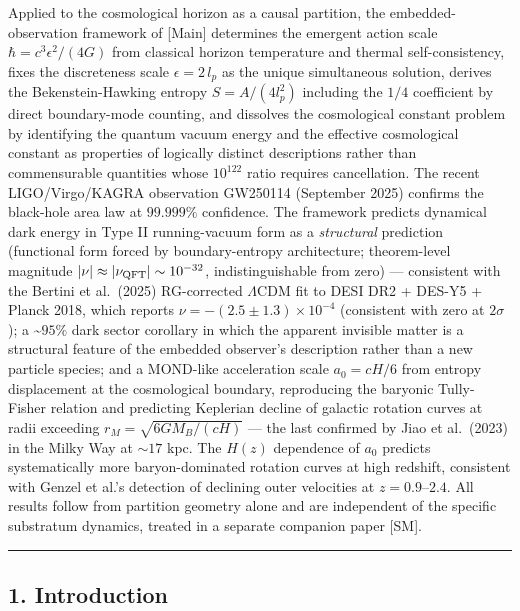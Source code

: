 \documentclass[
]{article}
\begin{document}
Applied to the cosmological horizon as a causal partition, the
embedded-observation framework of {[}Main{]} determines the emergent
action scale \(\hbar = c^3 \epsilon^2 / (4G)\) from classical horizon
temperature and thermal self-consistency, fixes the discreteness scale
\(\epsilon = 2\,l_p\) as the unique simultaneous solution, derives the
Bekenstein-Hawking entropy \(S = A/(4 l_p^2)\) including the \(1/4\)
coefficient by direct boundary-mode counting, and dissolves the
cosmological constant problem by identifying the quantum vacuum energy
and the effective cosmological constant as properties of logically
distinct descriptions rather than commensurable quantities whose
\(10^{122}\) ratio requires cancellation. The recent LIGO/Virgo/KAGRA
observation GW250114 (September 2025) confirms the black-hole area law
at \(99.999\%\) confidence. The framework predicts dynamical dark energy
in Type II running-vacuum form as a \emph{structural} prediction
(functional form forced by boundary-entropy architecture; theorem-level
magnitude \(|\nu| \approx |\nu_{\rm QFT}| \sim 10^{-32}\),
indistinguishable from zero) --- consistent with the Bertini et
al.~(2025) RG-corrected \(\Lambda\)CDM fit to DESI DR2 + DES-Y5 + Planck
2018, which reports \(\nu = -(2.5 \pm 1.3) \times 10^{-4}\) (consistent
with zero at \(2\sigma\)); a \textasciitilde{}\(95\%\) dark sector
corollary in which the apparent invisible matter is a structural feature
of the embedded observer's description rather than a new particle
species; and a MOND-like acceleration scale \(a_0 = cH/6\) from entropy
displacement at the cosmological boundary, reproducing the baryonic
Tully-Fisher relation and predicting Keplerian decline of galactic
rotation curves at radii exceeding \(r_M = \sqrt{6 G M_B/(cH)}\) --- the
last confirmed by Jiao et al.~(2023) in the Milky Way at \(\sim 17\)
kpc. The \(H(z)\) dependence of \(a_0\) predicts systematically more
baryon-dominated rotation curves at high redshift, consistent with
Genzel et al.'s detection of declining outer velocities at
\(z = 0.9\)--\(2.4\). All results follow from partition geometry alone
and are independent of the specific substratum dynamics, treated in a
separate companion paper {[}SM{]}.

\begin{center}\rule{0.5\linewidth}{0.5pt}\end{center}

\hypertarget{introduction}{%
\subsection{1. Introduction}\label{introduction}}
\end{document}
